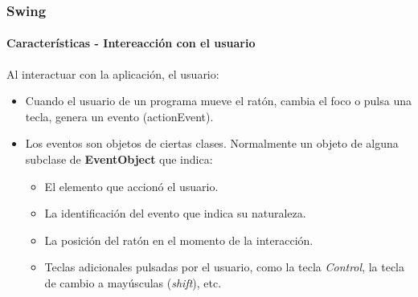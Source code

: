\documentclass{beamer}
\begin{document}
	\begin{frame}
		\frametitle{Swing}
		\framesubtitle{Caracter\'isticas - Intereacci\'on con el usuario}

        Al interactuar con la aplicaci\'on, el usuario:

	    \begin{itemize}
		    \item[] Cuando el usuario de un programa mueve el rat\'on, cambia el foco o pulsa una tecla, genera un evento (actionEvent).
		    \item[] Los eventos son objetos de ciertas clases. Normalmente un objeto de alguna subclase de \textbf{EventObject} que indica:
		    \begin{itemize}
        		    \item[\checkmark] El elemento que accion\'o el usuario.
        		    \item[\checkmark] La identificaci\'on del evento que indica su naturaleza.
        		    \item[\checkmark] La posici\'on del rat\'on en el momento de la interacci\'on.
        		    \item[\checkmark] Teclas adicionales pulsadas por el usuario, como la tecla \emph{Control}, la tecla de cambio a may\'usculas (\emph{shift}), etc.
	    	    \end{itemize}
        \end{itemize}
	\end{frame}
\end{document}
